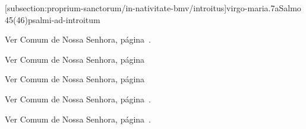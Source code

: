 \def\Prefix{subsection:proprium-sanctorum/in-nativitate-bmv}

[\Prefix/introitus]{virgo-maria.7a}{Salmo 45(46)}{psalmi-ad-introitum}

\begin{rubrica}
  Ver Comum de Nossa Senhora, página~\pageref{subsection:communia/commune-bmv/psalmus-responsorius}.
\end{rubrica}

\begin{rubrica}
  Ver Comum de Nossa Senhora, página~\pageref{subsection:communia/commune-bmv/alleluia}
\end{rubrica}

\begin{rubrica}
  Ver Comum de Nossa Senhora, página~\pageref{subsection:communia/commune-bmv/psalmus-alleluiaticus}
\end{rubrica}

\begin{rubrica}
  Ver Comum de Nossa Senhora, página~\pageref{subsection:communia/commune-bmv/offertorium}.
\end{rubrica}

\begin{rubrica}
  Ver Comum de Nossa Senhora, página~\pageref{subsection:communia/commune-bmv/communio-1}.
\end{rubrica}